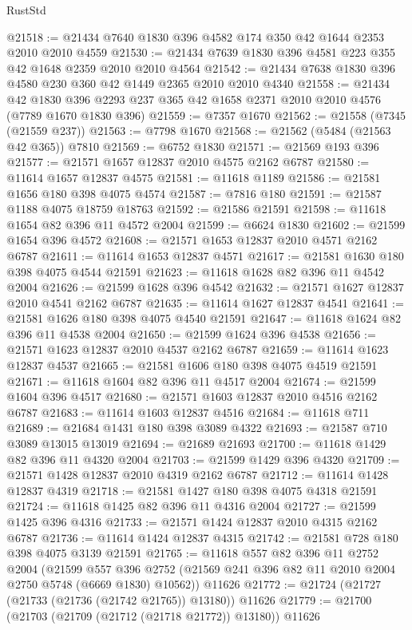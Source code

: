 \begin{lexlean}{RustStd}
\begin{coremodule}
{\begin{coremodule}
{{{{{{{{{{{{{{{{{{{{{{{{{{{{{{{@21518 := @21434 @7640 @1830 @396 @4582 @174 @350 @42 @1644 @2353 @2010 @2010 @4559
@21530 := @21434 @7639 @1830 @396 @4581 @223 @355 @42 @1648 @2359 @2010 @2010 @4564
@21542 := @21434 @7638 @1830 @396 @4580 @230 @360 @42 @1449 @2365 @2010 @2010 @4340
@21558 := @21434
    @42
    @1830
    @396
    @2293
    @237
    @365
    @42
    @1658
    @2371
    @2010
    @2010
    @4576
    (@7789 @1670 @1830 @396)
@21559 := @7357 @1670
@21562 := @21558 (@7345 (@21559 @237))
@21563 := @7798 @1670
@21568 := @21562 (@5484 (@21563 @42 @365)) @7810
@21569 := @6752 @1830
@21571 := @21569 @193 @396
@21577 := @21571 @1657 @12837 @2010 @4575 @2162 @6787
@21580 := @11614 @1657 @12837 @4575
@21581 := @11618 @1189
@21586 := @21581 @1656 @180 @398 @4075 @4574
@21587 := @7816 @180
@21591 := @21587 @1188 @4075 @18759 @18763
@21592 := @21586 @21591
@21598 := @11618 @1654 @82 @396 @11 @4572 @2004
@21599 := @6624 @1830
@21602 := @21599 @1654 @396 @4572
@21608 := @21571 @1653 @12837 @2010 @4571 @2162 @6787
@21611 := @11614 @1653 @12837 @4571
@21617 := @21581 @1630 @180 @398 @4075 @4544 @21591
@21623 := @11618 @1628 @82 @396 @11 @4542 @2004
@21626 := @21599 @1628 @396 @4542
@21632 := @21571 @1627 @12837 @2010 @4541 @2162 @6787
@21635 := @11614 @1627 @12837 @4541
@21641 := @21581 @1626 @180 @398 @4075 @4540 @21591
@21647 := @11618 @1624 @82 @396 @11 @4538 @2004
@21650 := @21599 @1624 @396 @4538
@21656 := @21571 @1623 @12837 @2010 @4537 @2162 @6787
@21659 := @11614 @1623 @12837 @4537
@21665 := @21581 @1606 @180 @398 @4075 @4519 @21591
@21671 := @11618 @1604 @82 @396 @11 @4517 @2004
@21674 := @21599 @1604 @396 @4517
@21680 := @21571 @1603 @12837 @2010 @4516 @2162 @6787
@21683 := @11614 @1603 @12837 @4516
@21684 := @11618 @711
@21689 := @21684 @1431 @180 @398 @3089 @4322
@21693 := @21587 @710 @3089 @13015 @13019
@21694 := @21689 @21693
@21700 := @11618 @1429 @82 @396 @11 @4320 @2004
@21703 := @21599 @1429 @396 @4320
@21709 := @21571 @1428 @12837 @2010 @4319 @2162 @6787
@21712 := @11614 @1428 @12837 @4319
@21718 := @21581 @1427 @180 @398 @4075 @4318 @21591
@21724 := @11618 @1425 @82 @396 @11 @4316 @2004
@21727 := @21599 @1425 @396 @4316
@21733 := @21571 @1424 @12837 @2010 @4315 @2162 @6787
@21736 := @11614 @1424 @12837 @4315
@21742 := @21581 @728 @180 @398 @4075 @3139 @21591
@21765 := @11618
    @557
    @82
    @396
    @11
    @2752
    @2004
    (@21599 @557 @396 @2752 (@21569 @241 @396 @82 @11 @2010 @2004 @2750 @5748 (@6669 @1830) @10562))
    @11626
@21772 := @21724 (@21727 (@21733 (@21736 (@21742 @21765)) @13180)) @11626
@21779 := @21700 (@21703 (@21709 (@21712 (@21718 @21772)) @13180)) @11626
}}}}}}}}}}}}}}}}}}}}}}}}}}}}}}}
\end{coremodule}}
\end{coremodule}
\end{lexlean}
